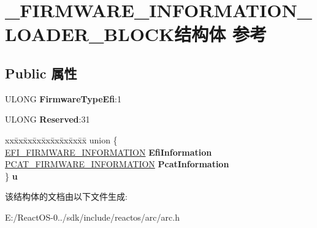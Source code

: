 \hypertarget{struct___f_i_r_m_w_a_r_e___i_n_f_o_r_m_a_t_i_o_n___l_o_a_d_e_r___b_l_o_c_k}{}\section{\+\_\+\+F\+I\+R\+M\+W\+A\+R\+E\+\_\+\+I\+N\+F\+O\+R\+M\+A\+T\+I\+O\+N\+\_\+\+L\+O\+A\+D\+E\+R\+\_\+\+B\+L\+O\+C\+K结构体 参考}
\label{struct___f_i_r_m_w_a_r_e___i_n_f_o_r_m_a_t_i_o_n___l_o_a_d_e_r___b_l_o_c_k}
\subsection*{Public 属性}
\begin{DoxyCompactItemize}
\item 
\mbox{\label{struct___f_i_r_m_w_a_r_e___i_n_f_o_r_m_a_t_i_o_n___l_o_a_d_e_r___b_l_o_c_k_a8388a591f5c91829b4dd299191a3804b}} 
U\+L\+O\+NG {\bfseries Firmware\+Type\+Efi}\+:1
\item 
\mbox{\label{struct___f_i_r_m_w_a_r_e___i_n_f_o_r_m_a_t_i_o_n___l_o_a_d_e_r___b_l_o_c_k_ad32287dbd63366a956b03c39eb573db9}} 
U\+L\+O\+NG {\bfseries Reserved}\+:31
\item 
\mbox{\label{struct___f_i_r_m_w_a_r_e___i_n_f_o_r_m_a_t_i_o_n___l_o_a_d_e_r___b_l_o_c_k_a25bf95d975bbca9c2807efce19e310e0}} 
\begin{tabbing}
xx\=xx\=xx\=xx\=xx\=xx\=xx\=xx\=xx\=\kill
union \{\\
\>\hyperlink{struct___e_f_i___f_i_r_m_w_a_r_e___i_n_f_o_r_m_a_t_i_o_n}{EFI\_FIRMWARE\_INFORMATION} {\bfseries EfiInformation}\\
\>\hyperlink{struct___p_c_a_t___f_i_r_m_w_a_r_e___i_n_f_o_r_m_a_t_i_o_n}{PCAT\_FIRMWARE\_INFORMATION} {\bfseries PcatInformation}\\
\} {\bfseries u}\\

\end{tabbing}\end{DoxyCompactItemize}


该结构体的文档由以下文件生成\+:\begin{DoxyCompactItemize}
\item 
E\+:/\+React\+O\+S-\/0../sdk/include/reactos/arc/arc.\+h\end{DoxyCompactItemize}
